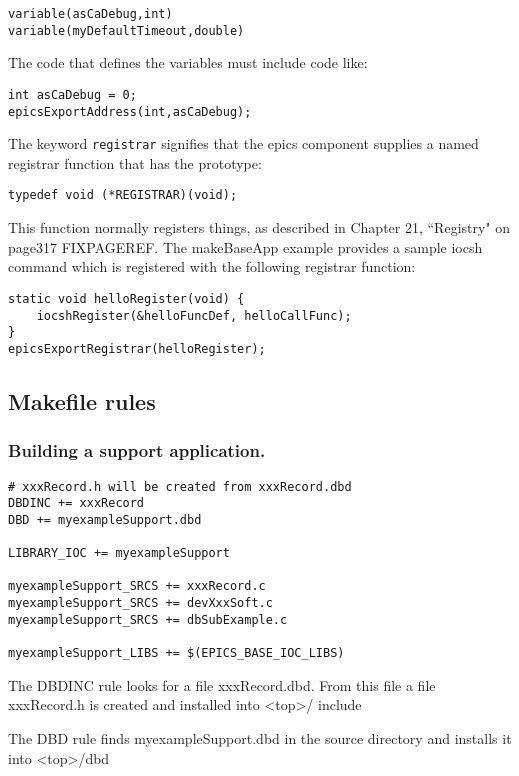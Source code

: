 \begin{verbatim}variable(asCaDebug,int)
variable(myDefaultTimeout,double)
\end{verbatim}The code that defines the variables must include code like:

\begin{verbatim}int asCaDebug = 0;
epicsExportAddress(int,asCaDebug);
\end{verbatim}The keyword \verb|registrar| signifies that the epics component supplies a named registrar function that has the prototype:

\begin{verbatim}typedef void (*REGISTRAR)(void);
\end{verbatim}This function normally registers things, as described in Chapter 21, ``Registry" on page317 FIXPAGEREF. The makeBaseApp example 
provides a sample iocsh command which is registered with the following registrar function:

\begin{verbatim}static void helloRegister(void) {
    iocshRegister(&helloFuncDef, helloCallFunc);
}
epicsExportRegistrar(helloRegister);
\end{verbatim}
\subsection{Makefile rules}

\subsubsection{Building a support application.}

\begin{verbatim}# xxxRecord.h will be created from xxxRecord.dbd
DBDINC += xxxRecord
DBD += myexampleSupport.dbd

LIBRARY_IOC += myexampleSupport

myexampleSupport_SRCS += xxxRecord.c
myexampleSupport_SRCS += devXxxSoft.c
myexampleSupport_SRCS += dbSubExample.c

myexampleSupport_LIBS += $(EPICS_BASE_IOC_LIBS)
\end{verbatim}The DBDINC rule looks for a file xxxRecord.dbd. From this file a file xxxRecord.h is created and installed into \textless{}top\textgreater{}/
include

The DBD rule finds myexampleSupport.dbd in the source directory and installs it into \textless{}top\textgreater{}/dbd

